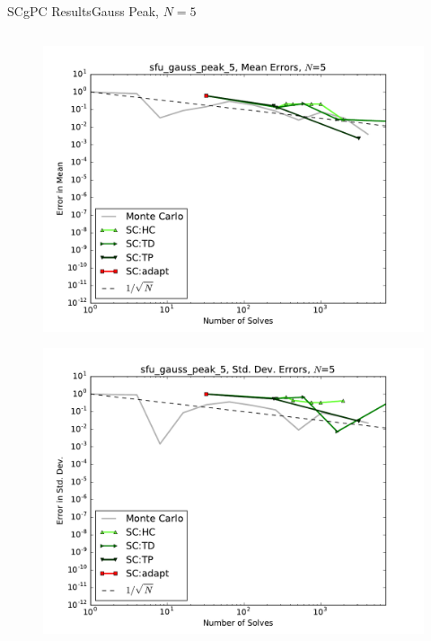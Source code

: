 \documentclass{beamer}
\begin{document}
\begin{frame}{SCgPC Results}{Gauss Peak, $N=5$}
\begin{columns}
\begin{column}{0.5\textwidth}
\begin{figure}[h!]
          \includegraphics[width=0.8\linewidth]{anlmodels/sfu_gauss_peak_5_mean_errs_nohdmr}
        \end{figure}
        \vspace{-20pt}
        \begin{figure}[h!]
          \centering
          \includegraphics[width=0.8\linewidth]{anlmodels/sfu_gauss_peak_5_variance_errs_nohdmr}
        \end{figure}
   \end{column}
 \end{columns}
\end{frame}
\end{document}
